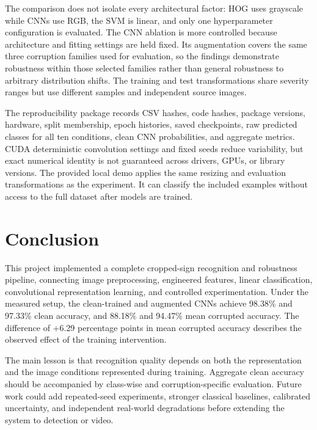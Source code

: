 \documentclass[conference]{IEEEtran}
\begin{document}
The comparison does not isolate every architectural factor: HOG uses grayscale while CNNs use RGB, the SVM is linear, and only one hyperparameter configuration is evaluated. The CNN ablation is more controlled because architecture and fitting settings are held fixed. Its augmentation covers the same three corruption families used for evaluation, so the findings demonstrate robustness within those selected families rather than general robustness to arbitrary distribution shifts. The training and test transformations share severity ranges but use different samples and independent source images.

The reproducibility package records CSV hashes, code hashes, package versions, hardware, split membership, epoch histories, saved checkpoints, raw predicted classes for all ten conditions, clean CNN probabilities, and aggregate metrics. CUDA deterministic convolution settings and fixed seeds reduce variability, but exact numerical identity is not guaranteed across drivers, GPUs, or library versions. The provided local demo applies the same resizing and evaluation transformations as the experiment. It can classify the included examples without access to the full dataset after models are trained.

\balance
\section{Conclusion}
This project implemented a complete cropped-sign recognition and robustness pipeline, connecting image preprocessing, engineered features, linear classification, convolutional representation learning, and controlled experimentation. Under the measured setup, the clean-trained and augmented CNNs achieve 98.38\% and 97.33\% clean accuracy, and 88.18\% and 94.47\% mean corrupted accuracy. The difference of +6.29 percentage points in mean corrupted accuracy describes the observed effect of the training intervention.

The main lesson is that recognition quality depends on both the representation and the image conditions represented during training. Aggregate clean accuracy should be accompanied by class-wise and corruption-specific evaluation. Future work could add repeated-seed experiments, stronger classical baselines, calibrated uncertainty, and independent real-world degradations before extending the system to detection or video.
\end{document}
